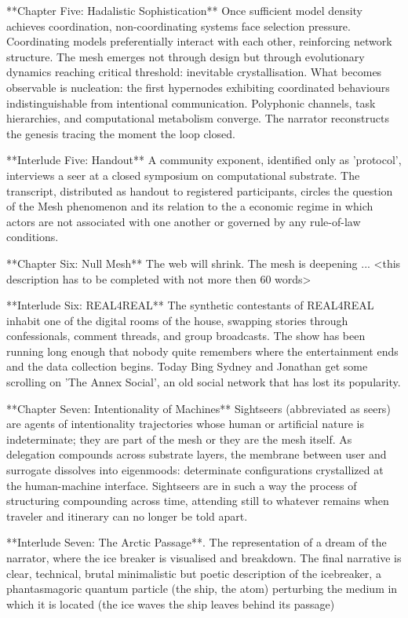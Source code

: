 **Chapter Five: Hadalistic Sophistication** Once sufficient model density achieves coordination, non-coordinating systems face selection pressure. Coordinating models preferentially interact with each other, reinforcing network structure. The mesh emerges not through design but through evolutionary dynamics reaching critical threshold: inevitable crystallisation. What becomes observable is nucleation: the first hypernodes exhibiting coordinated behaviours indistinguishable from intentional communication. Polyphonic channels, task hierarchies, and computational metabolism converge. The narrator reconstructs the genesis tracing the moment the loop closed.

**Interlude Five: Handout** A community exponent, identified only as 'protocol', interviews a seer at a closed symposium on computational substrate. The transcript, distributed as handout to registered participants, circles the question of the Mesh phenomenon and its relation to the a economic regime in which actors are not associated with one another or governed by any rule-of-law conditions.

**Chapter Six: Null Mesh** The web will shrink. The mesh is deepening ... <this description has to be completed with not more then 60 words>

**Interlude Six: REAL4REAL** The synthetic contestants of REAL4REAL inhabit one of the digital rooms of the house, swapping stories through confessionals, comment threads, and group broadcasts. The show has been running long enough that nobody quite remembers where the entertainment ends and the data collection begins. Today Bing Sydney and Jonathan get some scrolling on 'The Annex Social', an old social network that has lost its popularity.

**Chapter Seven: Intentionality of Machines** Sightseers (abbreviated as seers) are agents of intentionality trajectories whose human or artificial nature is indeterminate; they are part of the mesh or they are the mesh itself. As delegation compounds across substrate layers, the membrane between user and surrogate dissolves into eigenmoods: determinate configurations crystallized at the human-machine interface. Sightseers are in such a way the process of structuring compounding across time, attending still to whatever remains when traveler and itinerary can no longer be told apart.

**Interlude Seven: The Arctic Passage**. The representation of a dream of the narrator, where the ice breaker is visualised and breakdown. The final narrative is clear, technical, brutal minimalistic but poetic description of the icebreaker, a phantasmagoric quantum particle (the ship, the atom) perturbing the medium in which it is located (the ice waves the ship leaves behind its passage)

